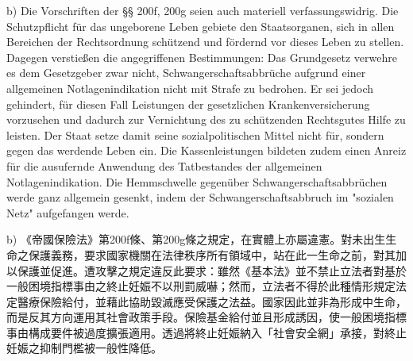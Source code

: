 \documentclass[12pt]{article}
\begin{document}
\begin{sourcepara}[title={原文理由 B.I.2.b}]
b) Die Vorschriften der §§ 200f, 200g \abbrRVO{} seien auch materiell verfassungswidrig. Die Schutzpflicht für das ungeborene Leben gebiete den Staatsorganen, sich in allen Bereichen der Rechtsordnung schützend und fördernd vor dieses Leben zu stellen. Dagegen verstießen die angegriffenen Bestimmungen: Das Grundgesetz verwehre es dem Gesetzgeber zwar nicht, Schwangerschaftsabbrüche aufgrund einer allgemeinen Notlagenindikation nicht mit Strafe zu bedrohen. Er sei jedoch gehindert, für diesen Fall Leistungen der gesetzlichen Krankenversicherung vorzusehen und dadurch zur Vernichtung des zu schützenden Rechtsgutes Hilfe zu leisten. Der Staat setze damit seine sozialpolitischen Mittel nicht für, sondern gegen das werdende Leben ein. Die Kassenleistungen bildeten zudem einen Anreiz für die ausufernde Anwendung des Tatbestandes der allgemeinen Notlagenindikation. Die Hemmschwelle gegenüber Schwangerschaftsabbrüchen werde ganz allgemein gesenkt, indem der Schwangerschaftsabbruch im "sozialen Netz" aufgefangen werde.
\end{sourcepara}
\begin{transpara}
b) 《帝國保險法》第200f條、第200g條之規定，在實體上亦屬違憲。對未出生生命之保護義務，要求國家機關在法律秩序所有領域中，站在此一生命之前，對其加以保護並促進。遭攻擊之規定違反此要求：雖然《基本法》並不禁止立法者對基於一般困境指標事由之終止妊娠不以刑罰威嚇；然而，立法者不得於此種情形規定法定醫療保險給付，並藉此協助毀滅應受保護之法益。國家因此並非為形成中生命，而是反其方向運用其社會政策手段。保險基金給付並且形成誘因，使一般困境指標事由構成要件被過度擴張適用。透過將終止妊娠納入「社會安全網」承接，對終止妊娠之抑制門檻被一般性降低。
\end{transpara}
\end{document}
